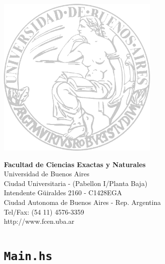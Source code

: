 \documentclass[a4paper]{article}
\begin{document}
\begin{multicols}{2}
\includegraphics[width=8cm]{logo-uba.png}

\columnbreak
\vspace*{4.5cm}
\raggedleft
\textbf{Facultad de Ciencias Exactas y Naturales}\\
Universidad de Buenos Aires\\
\small
Ciudad Universitaria - (Pabellon I/Planta Baja)\\
Intendente G\"uiraldes 2160 - C1428EGA\\
Ciudad Autonoma de Buenos Aires - Rep. Argentina\\
Tel/Fax: (54 11) 4576-3359\\
http://www.fcen.uba.ar
\end{multicols}

\restoregeometry

\clearpage


\clearpage

\section{\texttt{Main.hs}}
\end{document}
